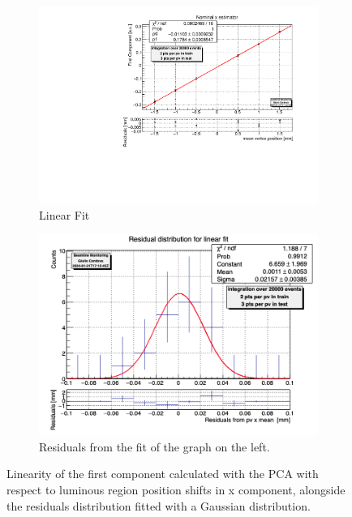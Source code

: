 \begin{figure}
    \centering
    \begin{subfigure}{0.48\textwidth}
    \includegraphics[width=\linewidth]{figures/x_fit_MC.pdf}
    \caption{Linear Fit}\label{fig:xfit_MC}
    \end{subfigure}
    \begin{subfigure}{0.48\textwidth}
    \includegraphics[width=\linewidth]{figures/x_res_MC.png}
    \caption{Residuals from the fit of the graph on the left. }\label{fig:xres_MC}
    \end{subfigure}
    \caption{Linearity of the first component calculated with the PCA with respect to luminous region position shifts in x component, alongside the residuals distribution fitted with a Gaussian distribution.}
    \label{fig:x_MC}
\end{figure}



